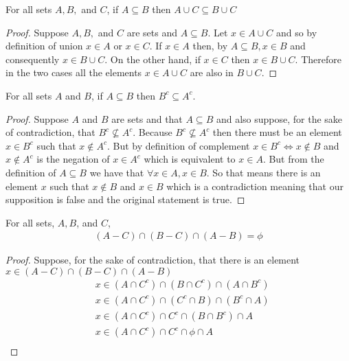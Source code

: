 \documentclass[12pt,letterpaper, onecolumn]{exam}
\begin{document}
	\begin{questions}
		\setcounter{question}{13}\question For all sets $A,B,$ and $C$, if $A\subseteq B$ then $A\cup C \subseteq B\cup C$
		\begin{solution}
			\begin{proof}
			Suppose $A,B,$ and $C$ are sets and $A\subseteq B$. Let $x\in A\cup C$ and so by definition of union $x\in A$ or $x\in C$.  If $x\in A$ then, by $A\subseteq B, x\in B$ and consequently $x\in B \cup C$. On the other hand, if $x\in C$ then $x\in B \cup C$. Therefore in the two cases all the elements $x \in A\cup C$ are also in $B\cup C$.
			\end{proof}
		\end{solution}
		\question For all sets $A$ and $B$, if $A\subseteq B$ then $B^c \subseteq A^c$.
		\begin{solution}
			\begin{proof}
			Suppose $A$ and $B$ are sets and that $A\subseteq B$ and also suppose, for the sake of contradiction, that $B^c \not\subseteq A^c$. Because $B^c \not\subseteq A^c$ then there must be an element $x \in B^c$ such that $x\notin A^c$. But by definition of complement $x\in B^c \Leftrightarrow x\notin B$ and $x\notin A^c$ is the negation of $x\in A^c$ which is equivalent to $x\in A$. But from the definition of $A\subseteq B$ we have that $\forall x\in A, x\in B$. So that means there is an element $x$ such that $x\notin B$ and $x\in B$ which is a contradiction meaning that our supposition is false and the original statement is true.
			\end{proof}
		\end{solution}
		\setcounter{question}{25}\question For all sets, $A,B$, and $C$,
		\begin{align*}
							(A-C)\cap (B-C)\cap (A-B)=\phi
							\!
		\end{align*}
		\begin{solution}
			\begin{proof}
				Suppose, for the sake of contradiction, that there is an element $x\in(A-C)\cap (B-C)\cap (A-B)$
				\begin{align*}
					&x\in (A\cap C^c) \cap (B\cap C^c) \cap (A\cap B^c)\tag{By definition of difference}\\
					&x\in (A\cap C^c) \cap (C^c \cap B) \cap (B^c\cap A)\tag{By commutativity}\\
					&x\in (A\cap C^c) \cap C^c \cap (B \cap B^c)\cap A\tag{By associativity}\\
					&x\in (A\cap C^c) \cap C^c \cap \phi\cap A\tag{By complement}\\

\end{align*}
\end{proof}
\end{solution}
\end{questions}
\end{document}
